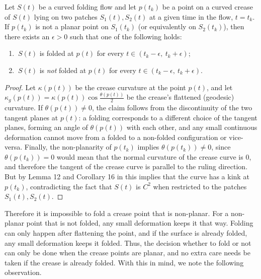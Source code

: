 \begin{theorem}\label{Thm:curved_folding_open_condition}
Let $S(t)$ be a curved folding flow and let $p(t_k)$ be a point on a curved crease of $S(t)$ lying on two patches $S_1(t),S_2(t)$ at a given time in the flow, $t=t_k$. If $p(t_k)$ is not a planar point on $S_1(t_k)$ (or equivalently on $S_2(t_k)$), then there exists an $\epsilon > 0$ such that one of the following holds:
\begin{enumerate}
	\item $\ S(t)$ is folded at $p(t)$ for every $t \in (t_k-\epsilon, \ t_k+\epsilon)$;
	\item $\ S(t)$ is \emph{not} folded at $p(t)$ for every $t \in (t_k-\epsilon, \ t_k+\epsilon)$.
\end{enumerate}
\end{theorem}
\begin{proof}
Let $\kappa(p(t))$ be the crease curvature at the point $p(t)$, and let $\kappa_g(p(t)) = \kappa(p(t))\cos\frac{\theta(p(t))}{2}$ be the crease's flattened (geodesic) curvature. If $\theta(p(t)) \neq 0$, the claim follows from the discontinuity of the two tangent planes at $p(t)$: a folding corresponds to a different choice of the tangent planes, forming an angle of $\theta(p(t))$ with each other, and any small continuous deformation cannot move from a folded to a non-folded configuration or vice-versa. Finally, the non-planarity of $p(t_k)$ implies $\theta(p(t_k)) \neq 0$, since $\theta(p(t_k)) = 0$ would mean that the normal curvature of the crease curve is $0$, and therefore the tangent of the crease curve is parallel to the ruling direction.
But by Lemma 12 and Corollary 16 in \cite{demaine_lens} this implies that the curve has a kink at  $p(t_k)$, contradicting the fact that $S(t)$ is $C^2$ when restricted to the patches $S_1(t), S_2(t)$.
\end{proof}

Therefore it is impossible to fold a crease point that is non-planar. For a non-planar point that is not folded, any small deformation keeps it that way. Folding can only happen after flattening the point, and if the surface is already folded, any small deformation keeps it folded. Thus, the decision whether to fold or not can only be done when the crease points are planar, and no extra care needs be taken if the crease is already folded. With this in mind, we note the following observation.


